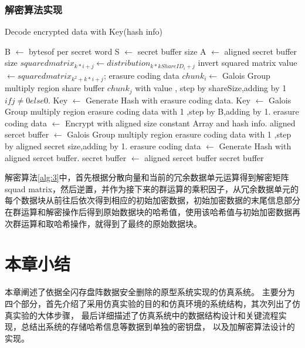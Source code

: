\subsubsection{解密算法实现}
\begin{algorithm}[H]
	\caption{Decode encrypted data with Key(hash info)}
	\label{alg:3}
	\begin{algorithmic}
		\STATE B $\gets$ bytesof per secret word
		\STATE S $\gets$ secret buffer size
		\STATE A $\gets$ aligned secret buffer size
		\STATE $squared matrix_{k*i+j} \gets distribution_{k*kShareID_{i}+j}$
		\ENDFOR
		\ENDFOR
		\STATE invert squared matrix
		\STATE value $\gets squared matrix_{k^2+k*i+j}$;
		\STATE erasure coding data $chunk_i \gets$ Galois Group multiply region  share buffer $chunk_j$ with value ,
		step by shareSize,adding by 1 $if j \neq 0 else 0$.
		\ENDFOR
		\ENDFOR
		\STATE Key $\gets$ Generate Hash with erasure coding data.
		\STATE Key $\gets$ Galois Group multiply region  erasure coding data with 1 ,step by B,adding by 1.
		\STATE erasure coding data $\gets$ Encrypt with aligned size constant Array and hash info.
		\STATE aligned sercet buffer $\gets$ Galois Group multiply region  erasure coding data with 1 ,step by aligned secret size,adding by 1.
		\STATE erasure coding data $\gets$ Generate Hash with aligned sercet buffer.
		\STATE secret buffer $\gets$ aligned sercet buffer
		\RETURN secret buffer
	\end{algorithmic}
\end{algorithm}
解密算法\autoref{alg:3}中，首先根据分散向量和当前的冗余数据单元运算得到解密矩阵squad matrix，然后逆置，并作为接下来的群运算的乘积因子，从冗余数据单元的每个数据块从前往后依次得到相应的初始加密数据，初始加密数据的末尾信息部分在群运算和解密操作后得到原始数据块的哈希值，使用该哈希值与初始加密数据再次群运算和取哈希操作，就得到了最终的原始数据块。
\section{本章小结}
本章阐述了依据全闪存盘阵数据安全删除的原型系统实现的仿真系统。
主要分为四个部分，首先介绍了采用仿真实验的目的和仿真环境的系统结构，其次列出了仿真实验的大体步骤，
最后详细描述了仿真系统中的数据结构设计和关键流程实现，总结出系统的存储哈希信息等数据到单独的密钥盘，
以及加解密算法设计的实现。
